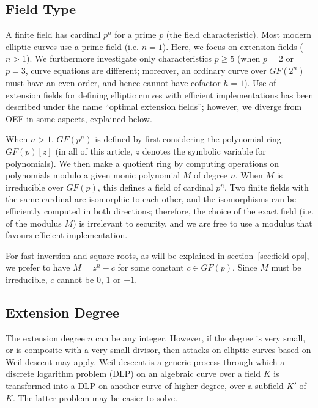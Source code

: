 \documentclass{llncs}
\newcommand{\GF}{GF}
\begin{document}
\subsection{Field Type}

A finite field has cardinal $p^n$ for a prime $p$ (the field
characteristic). Most modern elliptic curves use a prime field (i.e. $n
= 1$). Here, we focus on extension fields ($n > 1$). We furthermore
investigate only characteristics $p \geq 5$ (when $p = 2$ or $p = 3$,
curve equations are different; moreover, an ordinary curve over
$\GF(2^n)$ must have an even order, and hence cannot have cofactor $h =
1$). Use of extension fields for defining elliptic curves with efficient
implementations has been described under the name ``optimal extension
fields''\cite{Mih1997,BaiPaa1998}; however, we diverge from OEF in some
aspects, explained below.

When $n > 1$, $\GF(p^n)$ is defined by first considering the
polynomial ring $\GF(p)[z]$ (in all of this article, $z$ denotes the
symbolic variable for polynomials). We then make a quotient ring by
computing operations on polynomials modulo a given monic polynomial $M$
of degree $n$. When $M$ is irreducible over $\GF(p)$, this defines a
field of cardinal $p^n$. Two finite fields with the same cardinal are
isomorphic to each other, and the isomorphisms can be efficiently
computed in both directions; therefore, the choice of the exact field
(i.e. of the modulus $M$) is irrelevant to security, and we are free to
use a modulus that favours efficient implementation.

For fast inversion and square roots, as will be explained in
section~\ref{sec:field-ops}, we prefer to have $M = z^n - c$ for some
constant $c \in \GF(p)$. Since $M$ must be irreducible, $c$ cannot be
$0$, $1$ or $-1$.

\subsection{Extension Degree}\label{sec:find-field:degree}

The extension degree $n$ can be any integer. However, if the degree is
very small, or is composite with a very small divisor, then attacks on
elliptic curves based on Weil descent may apply. Weil descent is a
generic process through which a discrete logarithm problem (DLP) on an
algebraic curve over a field $K$ is transformed into a DLP on another
curve of higher degree, over a subfield $K'$ of $K$. The latter problem
may be easier to solve.
\end{document}
